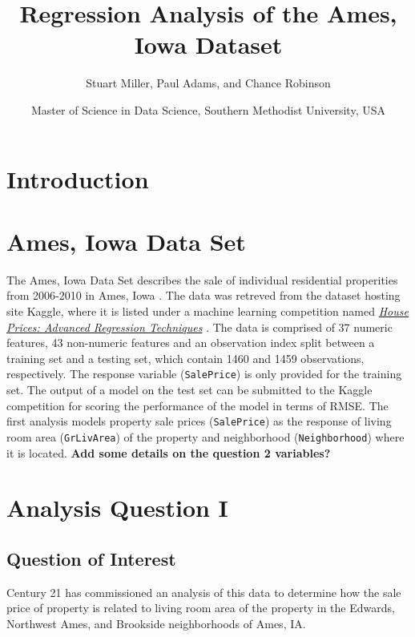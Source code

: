 \documentclass[american,]{article}
\title{Regression Analysis of the Ames, Iowa Dataset}
\author{Stuart Miller, Paul Adams, and Chance Robinson}
\date{Master of Science in Data Science, Southern Methodist University, USA}
\theoremstyle{definition}
\theoremstyle{definition}
\theoremstyle{definition}
\theoremstyle{remark}
\begin{document}
\maketitle

\hypertarget{introduction}{%
\section{Introduction}\label{introduction}}

\citet{Sleuth}

\hypertarget{ames-iowa-data-set}{%
\section{Ames, Iowa Data Set}\label{ames-iowa-data-set}}

The Ames, Iowa Data Set describes the sale of individual residential
properities from 2006-2010 in Ames, Iowa \cite{Cock}. The data was
retreved from the dataset hosting site Kaggle, where it is listed under
a machine learning competition named
\href{https://www.kaggle.com/c/house-prices-advanced-regression-techniques/overview}{\textit{House Prices: Advanced Regression Techniques}}
\cite{Kaggle2016}. The data is comprised of 37 numeric features, 43
non-numeric features and an observation index split between a training
set and a testing set, which contain 1460 and 1459 observations,
respectively. The response variable (\texttt{SalePrice}) is only
provided for the training set. The output of a model on the test set can
be submitted to the Kaggle competition for scoring the performance of
the model in terms of RMSE. The first analysis models property sale
prices (\texttt{SalePrice}) as the response of living room area
(\texttt{GrLivArea}) of the property and neighborhood
(\texttt{Neighborhood}) where it is located. \textbf{Add some details on
the question 2 variables?}

\hypertarget{analysis-question-i}{%
\section{Analysis Question I}\label{analysis-question-i}}

\hypertarget{question-of-interest}{%
\subsection{Question of Interest}\label{question-of-interest}}

Century 21 has commissioned an analysis of this data to determine how
the sale price of property is related to living room area of the
property in the Edwards, Northwest Ames, and Brookside neighborhoods of
Ames, IA.
\end{document}
